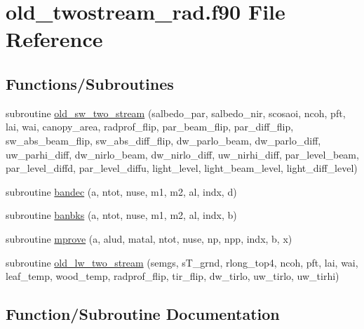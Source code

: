 \hypertarget{old__twostream__rad_8f90}{}\section{old\+\_\+twostream\+\_\+rad.\+f90 File Reference}
\label{old__twostream__rad_8f90}
\subsection*{Functions/\+Subroutines}
\begin{DoxyCompactItemize}
\item 
subroutine \hyperlink{old__twostream__rad_8f90_a836a0d64d7bb3262bb85a0234cb36bea}{old\+\_\+sw\+\_\+two\+\_\+stream} (salbedo\+\_\+par, salbedo\+\_\+nir, scosaoi, ncoh, pft, lai, wai, canopy\+\_\+area, radprof\+\_\+flip, par\+\_\+beam\+\_\+flip, par\+\_\+diff\+\_\+flip, sw\+\_\+abs\+\_\+beam\+\_\+flip, sw\+\_\+abs\+\_\+diff\+\_\+flip, dw\+\_\+parlo\+\_\+beam, dw\+\_\+parlo\+\_\+diff, uw\+\_\+parhi\+\_\+diff, dw\+\_\+nirlo\+\_\+beam, dw\+\_\+nirlo\+\_\+diff, uw\+\_\+nirhi\+\_\+diff, par\+\_\+level\+\_\+beam, par\+\_\+level\+\_\+diffd, par\+\_\+level\+\_\+diffu, light\+\_\+level, light\+\_\+beam\+\_\+level, light\+\_\+diff\+\_\+level)
\item 
subroutine \hyperlink{old__twostream__rad_8f90_a6ebe8b542c9350d34aae0515753b29bf}{bandec} (a, ntot, nuse, m1, m2, al, indx, d)
\item 
subroutine \hyperlink{old__twostream__rad_8f90_a43f0966137654368f596fcb9d9019b82}{banbks} (a, ntot, nuse, m1, m2, al, indx, b)
\item 
subroutine \hyperlink{old__twostream__rad_8f90_a4706dfdfc064dbcb59617aad9d555474}{mprove} (a, alud, matal, ntot, nuse, np, npp, indx, b, x)
\item 
subroutine \hyperlink{old__twostream__rad_8f90_a23245b8d2ae882776ded0e620001a021}{old\+\_\+lw\+\_\+two\+\_\+stream} (semgs, s\+T\+\_\+grnd, rlong\+\_\+top4, ncoh, pft, lai, wai, leaf\+\_\+temp, wood\+\_\+temp, radprof\+\_\+flip, tir\+\_\+flip, dw\+\_\+tirlo, uw\+\_\+tirlo, uw\+\_\+tirhi)
\end{DoxyCompactItemize}


\subsection{Function/\+Subroutine Documentation}
\mbox{\label{old__twostream__rad_8f90_a43f0966137654368f596fcb9d9019b82}} 
